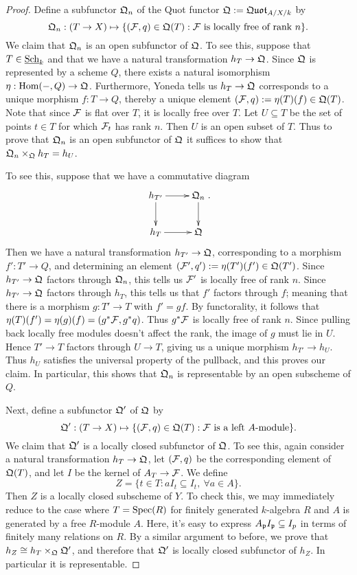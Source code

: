 \begin{proof}
Define a subfunctor $\mathfrak{Q}_n$ of the Quot functor $\mathfrak{Q} := \mathfrak{Quot}_{A/X/k}$ by
$$\mathfrak{Q}_n: (T\rightarrow X)\mapsto \{(\mathcal{F},q)\in \mathfrak{Q}(T): \mathcal{F}\ \text{is locally free of rank $n$}\}.$$
We claim that $\mathfrak{Q}_n$ is an open subfunctor of $\mathfrak{Q}$.  To see this, suppose that $T\in\textnormal{\underline{Sch}}_k$ and that we have a natural transformation $h_T\rightarrow \mathfrak{Q}$.  Since $\mathfrak{Q}$ is represented by a scheme $Q$, there exists a natural isomorphism $\eta: \textnormal{Hom}(-,Q)\rightarrow\mathfrak{Q}$.  Furthermore, Yoneda tells us $h_T\rightarrow \mathfrak{Q}$ corresponds to a unique morphism $f:T\rightarrow Q$, thereby a unique element $(\mathcal{F},q) := \eta(T)(f)\in \mathfrak{Q}(T)$.  Note that since $\mathcal{F}$ is flat over $T$, it is locally free over $T$.  Let $U\subseteq T$ be the set of points $t\in T$ for which $\mathcal{F}_t$ has rank $n$.  Then $U$ is an open subset of $T$.  Thus to prove that $\mathfrak{Q}_n$ is an open subfunctor of $\mathfrak{Q}$ it suffices to show that $\mathfrak{Q}_n\times_{\mathfrak{Q}}h_T = h_U$.

To see this, suppose that we have a commutative diagram
$$\xymatrix{
h_{T'}\ar[d]\ar[r] & \FQ_n\ar[d]\\
h_{T}\ar[r]        & \FQ
}.$$
Then we have a natural transformation $h_{T'}\rightarrow\mathfrak{Q}$, corresponding to a morphism $f': T'\rightarrow Q$, and determining an element $(\mathcal{F}',q') := \eta(T')(f')\in \mathfrak{Q}(T')$.  Since $h_{T'}\rightarrow\mathfrak{Q}$ factors through $\mathfrak{Q}_n$, this tells us $\mathcal{F}'$ is locally free of rank $n$.  Since $h_{T'}\rightarrow\mathfrak{Q}$ factors through $h_T$, this tells us that $f'$ factors through $f$; meaning that there is a morphism $g:T'\rightarrow T$ with $f'=gf$.  By functorality, it follows that $\eta(T)(f') = \eta(g)(f) = (g^*\mathcal{F},g^*q)$.  Thus $g^*\mathcal{F}$ is locally free of rank $n$.  Since pulling back locally free modules doesn't affect the rank, the image of $g$ must lie in $U$.  Hence $T'\rightarrow T$ factors through $U\rightarrow T$, giving us a unique morphism $h_{T'}\rightarrow h_U$.  Thus $h_U$ satisfies the universal property of the pullback, and this proves our claim.  In particular, this shows that $\mathfrak{Q}_n$ is representable by an open subscheme of $Q$.

Next, define a subfunctor $\mathfrak{Q}'$ of $\mathfrak{Q}$ by
$$\mathfrak{Q}': (T\rightarrow X)\mapsto \{(\mathcal{F},q)\in \mathfrak{Q}(T): \mathcal{F}\ \text{is a left $A$-module}\}.$$
We claim that $\mathfrak{Q}'$ is a locally closed subfunctor of $\mathfrak{Q}$.  To see this, again consider a natural transformation $h_T\rightarrow\mathfrak{Q}$, let $(\mathcal{F},q)$ be the corresponding element of $\mathfrak{Q}(T)$, and let $I$ be the kernel of $A_T\rightarrow \mathcal{F}$.  We define
$$Z = \{t\in T: aI_t\subseteq I_t,\ \forall a\in A\}.$$
Then $Z$ is a locally closed subscheme of $Y$.  To check this, we may immediately reduce to the case where $T=\textnormal{Spec}(R)$ for finitely generated $k$-algebra $R$ and $A$ is generated by a free $R$-module $A$.  Here, it's easy to express $A_{\mathfrak{p}} I_{\mathfrak{p}}\subseteq I_p$ in terms of finitely many relations on $R$.  By a similar argument to before, we prove that $h_Z\cong h_T\times_{\mathfrak{Q}} \mathfrak{Q}'$, and therefore that $\mathfrak{Q}'$ is locally closed subfunctor of $h_Z$.  In particular it is representable.


\end{proof}
